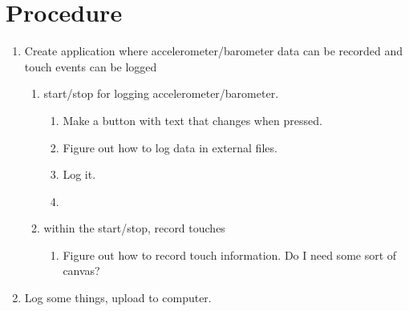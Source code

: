 \documentclass[12pt]{article}
\begin{document}
\section{Procedure}
\begin{enumerate}
	\item Create application where accelerometer/barometer data can be recorded and touch events can be logged
	\begin{enumerate}
		\item start/stop for logging accelerometer/barometer.
			\begin{enumerate}
				\item Make a button with text that changes when pressed.
				\item Figure out how to log data in external files.
				\item Log it.
				\item 
			\end{enumerate}
		\item within the start/stop, record touches
			\begin{enumerate}
				\item Figure out how to record touch information. Do I need some sort of canvas?
			\end{enumerate}
	\end{enumerate}
	\item Log some things, upload to computer.


\end{enumerate}
\end{document}
